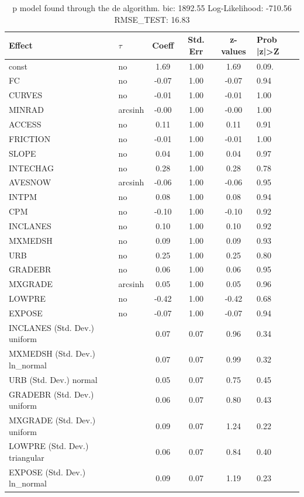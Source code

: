 \begin{table}
	\caption{p model found through the de algorithm. bic: 1892.55 Log-Likelihood: -710.56 RMSE_TEST: 16.83}
	\begin{center}
		\begin{tabular}{|l|l|c|c|c|l|}
			\hline
			Effect & $\tau$ & Coeff & Std. Err & z-values & Prob |z|>Z \\
			\hline
			const & no & 1.69 & 1.00 & 1.69 & 0.09. \\
			\hline
			FC & no & -0.07 & 1.00 & -0.07 & 0.94 \\
			\hline
			CURVES & no & -0.01 & 1.00 & -0.01 & 1.00 \\
			\hline
			MINRAD & arcsinh & -0.00 & 1.00 & -0.00 & 1.00 \\
			\hline
			ACCESS & no & 0.11 & 1.00 & 0.11 & 0.91 \\
			\hline
			FRICTION & no & -0.01 & 1.00 & -0.01 & 1.00 \\
			\hline
			SLOPE & no & 0.04 & 1.00 & 0.04 & 0.97 \\
			\hline
			INTECHAG & no & 0.28 & 1.00 & 0.28 & 0.78 \\
			\hline
			AVESNOW & arcsinh & -0.06 & 1.00 & -0.06 & 0.95 \\
			\hline
			INTPM & no & 0.08 & 1.00 & 0.08 & 0.94 \\
			\hline
			CPM & no & -0.10 & 1.00 & -0.10 & 0.92 \\
			\hline
			INCLANES & no & 0.10 & 1.00 & 0.10 & 0.92 \\
			\hline
			MXMEDSH & no & 0.09 & 1.00 & 0.09 & 0.93 \\
			\hline
			URB & no & 0.25 & 1.00 & 0.25 & 0.80 \\
			\hline
			GRADEBR & no & 0.06 & 1.00 & 0.06 & 0.95 \\
			\hline
			MXGRADE & arcsinh & 0.05 & 1.00 & 0.05 & 0.96 \\
			\hline
			LOWPRE & no & -0.42 & 1.00 & -0.42 & 0.68 \\
			\hline
			EXPOSE & no & -0.07 & 1.00 & -0.07 & 0.94 \\
			\hline
			INCLANES (Std. Dev.) uniform &  & 0.07 & 0.07 & 0.96 & 0.34 \\
			\hline
			MXMEDSH (Std. Dev.) ln_normal &  & 0.07 & 0.07 & 0.99 & 0.32 \\
			\hline
			URB (Std. Dev.) normal &  & 0.05 & 0.07 & 0.75 & 0.45 \\
			\hline
			GRADEBR (Std. Dev.) uniform &  & 0.06 & 0.07 & 0.80 & 0.43 \\
			\hline
			MXGRADE (Std. Dev.) uniform &  & 0.09 & 0.07 & 1.24 & 0.22 \\
			\hline
			LOWPRE (Std. Dev.) triangular &  & 0.06 & 0.07 & 0.84 & 0.40 \\
			\hline
			EXPOSE (Std. Dev.) ln_normal &  & 0.09 & 0.07 & 1.19 & 0.23 \\
			\hline
		\end{tabular}
	\end{center}
\end{table}